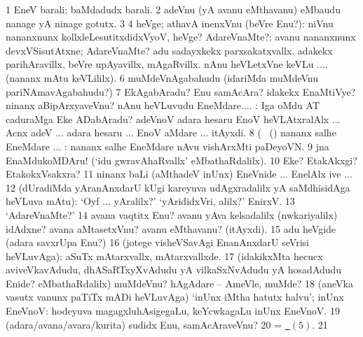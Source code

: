 {{{{{{\noindent 
\gl{\pagu}
\expl{}
\bmng
\bnum
\num{1}  EneV barali; baMdadudx barali. 
\num{2} adeVnu (yA avanu eMthavanu) eMbaudu nanage yA ninage gotutx. 
\num{3}  
\num{4}  heVge; athavA inenxVnu (beVre Enu?):  niVnu nananxnunx kollxleLesutitxdidxVyoV, heVge? 
  
\banum
{} AdareVnaMte?:  avanu nananxnunx devxVSisutAtxne; AdareVnaMte? adu sadayxkekx parxsakatxvallx. 
 adakekx parihAravillx, beVre upAyavillx, mAgaRvillx.  nAnu heVLetxVne keVLu .... (nananx mAtu keVLililx). 
\eanum
\numie
\num{6}  muMdeVnAgabahudu (idariMda muMdeVnu pariNAmavAgabahudu?) 
\num{7}  EkAgabAradu? Enu samAcAra? idakekx EnaMtiVye? ninanx aBipArxyaveVnu? nAnu heVLuvudu EneMdare.... :  Iga oMdu AT caduraMga Eke ADabAradu?  adeVnoV adara hesaru EnoV heVLAtxralAlx ... Acnx adeV ... adara hesaru ... EnoV aMdare ... itAyxdi. 
\num{8}  (\ame\  (\AmA) nananx salhe EneMdare ... :  nananx salhe EneMdare nAvu vishArxMti paDeyoVN. 
\num{9}  jna EnaMdukoMDAru! (`idu gwravAhaRvallx' eMbathaRdalilx). 
\num{10}  Eke? EtakAkxgi? EtakokxVsakxra? 
\num{11}  ninanx baLi (aMthadeV inUnx) EneVnide ... EnelAlx ive ... 
\num{12}  (dUradiMda yAranAnxdarU kUgi kareyuva udAgxradalilx yA saMdhisidAga heVLuva mAtu): `Oyf ... yAralilx?' `yArididxVri, alilx?' EnirxV. 
\num{13}  `AdareVnaMte?' 
\num{14}  avana vaqtitx Enu? avanu yAva kelsadalilx (nwkariyalilx) idAdxne? avana aMtasetxVnu? avanu eMthavanu? (itAyxdi). 
\num{15}  adu heVgide (adara savxrUpa Enu?) 
\num{16}  (jotege visheVSavAgi EnanAnxdarU seVrisi heVLuvAga): aSuTx mAtarxvallx, mAtarxvallxde. 
\num{17}  (idakikxMta hecucx aviveVkavAdudu, dhASaRTxyXvAdudu yA vilkaSxNvAdudu yA hosadAdudu Enide? eMbathaRdalilx) muMdeVnu? hAgAdare -- AmeVle, muMde? 
\num{18}  (aneVka vasutx \mo vanunx paTiTx mADi heVLuvAga) `inUnx iMtha hatutx halvu'; inUnx EneVnoV:  hodeyuva magagxluhAsigegaLu, keYcwkagaLu inUnx EneVnoV. 
\num{19}  (adara/avana/avara/kurita) sudidx Enu, samAcAraveVnu? 
\num{20}  = \hyperlink{what2 pagu5}{\pagu\ $(5)$}. 
\num{21}  
\enum
\emng
\eentry

}}}}}}
